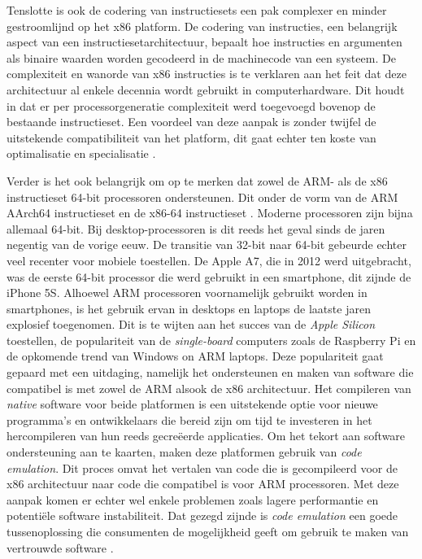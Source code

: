 Tenslotte is ook de codering van instructiesets een pak complexer en minder gestroomlijnd op het x86 platform. De codering van instructies, een belangrijk aspect van een instructiesetarchitectuur, bepaalt hoe instructies en argumenten als binaire waarden worden gecodeerd in de machinecode van een systeem. De complexiteit en wanorde van x86 instructies is te verklaren aan het feit dat deze architectuur al enkele decennia wordt gebruikt in computerhardware. Dit houdt in dat er per processorgeneratie complexiteit werd toegevoegd bovenop de bestaande instructieset. Een voordeel van deze aanpak is zonder twijfel de uitstekende compatibiliteit van het platform, dit gaat echter ten koste van optimalisatie en specialisatie \autocite{SarahHarris2015}.

Verder is het ook belangrijk om op te merken dat zowel de ARM- als de x86 instructieset 64-bit processoren ondersteunen. Dit onder de vorm van de ARM AArch64 instructieset en de x86-64 instructieset \autocite{ARM2022a}. Moderne processoren zijn bijna allemaal 64-bit. Bij desktop-processoren is dit reeds het geval sinds de jaren negentig van de vorige eeuw. De transitie van 32-bit naar 64-bit gebeurde echter veel recenter voor mobiele toestellen. De Apple A7, die in 2012 werd uitgebracht, was de eerste 64-bit processor die werd gebruikt in een smartphone, dit zijnde de iPhone 5S. Alhoewel ARM processoren voornamelijk gebruikt worden in smartphones, is het gebruik ervan in desktops en laptops de laatste jaren explosief toegenomen. Dit is te wijten aan het succes van de \textit{Apple Silicon} toestellen, de populariteit van de \textit{single-board} computers zoals de Raspberry Pi en de opkomende trend van Windows on ARM laptops. Deze populariteit gaat gepaard met een uitdaging, namelijk het ondersteunen en maken van software die compatibel is met zowel de ARM alsook de x86 architectuur. Het compileren van \textit{native} software voor beide platformen is een uitstekende optie voor nieuwe programma’s en ontwikkelaars die bereid zijn om tijd te investeren in het hercompileren van hun reeds gecreëerde applicaties. Om het tekort aan software ondersteuning aan te kaarten, maken deze platformen gebruik van \textit{code emulation}. Dit proces omvat het vertalen van code die is gecompileerd voor de x86 architectuur naar code die compatibel is voor ARM processoren. Met deze aanpak komen er echter wel enkele problemen zoals lagere performantie en potentiële software instabiliteit. Dat gezegd zijnde is \textit{code emulation} een goede tussenoplossing die consumenten de mogelijkheid geeft om gebruik te maken van vertrouwde software \autocite{Triggs2022a}.

